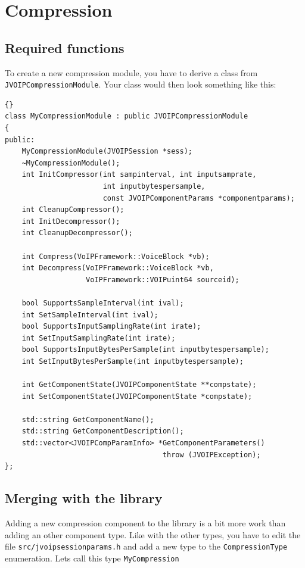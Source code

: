 	\section{Compression}

		\subsection{Required functions}

		To create a new compression module, you have to derive a class from
		{\tt JVOIP\-Com\-pres\-sion\-Mo\-dule}. Your class would then look something
		like this:
		\begin{lstlisting}[frame=tb]{}
class MyCompressionModule : public JVOIPCompressionModule
{
public:
	MyCompressionModule(JVOIPSession *sess);
	~MyCompressionModule();
	int InitCompressor(int sampinterval, int inputsamprate, 
	                   int inputbytespersample,
	                   const JVOIPComponentParams *componentparams);
	int CleanupCompressor();
	int InitDecompressor();
	int CleanupDecompressor();

	int Compress(VoIPFramework::VoiceBlock *vb);
	int Decompress(VoIPFramework::VoiceBlock *vb,
	               VoIPFramework::VOIPuint64 sourceid);

	bool SupportsSampleInterval(int ival);
	int SetSampleInterval(int ival);
	bool SupportsInputSamplingRate(int irate);
	int SetInputSamplingRate(int irate);
	bool SupportsInputBytesPerSample(int inputbytespersample);
	int SetInputBytesPerSample(int inputbytespersample);

	int GetComponentState(JVOIPComponentState **compstate);
	int SetComponentState(JVOIPComponentState *compstate);

	std::string GetComponentName();
	std::string GetComponentDescription();
	std::vector<JVOIPCompParamInfo> *GetComponentParameters() 
	                                 throw (JVOIPException);
};
		\end{lstlisting}
		
		\subsection{Merging with the library}
		
		Adding a new compression component to the library is a bit more work than
		adding an other component type. Like with the other types, you have to edit
		the file {\tt src\-/jvoip\-ses\-sion\-pa\-rams.h} and add a new type to the 
		{\tt CompressionType} enumeration. Lets call this type {\tt My\-Com\-pres\-sion}
		
